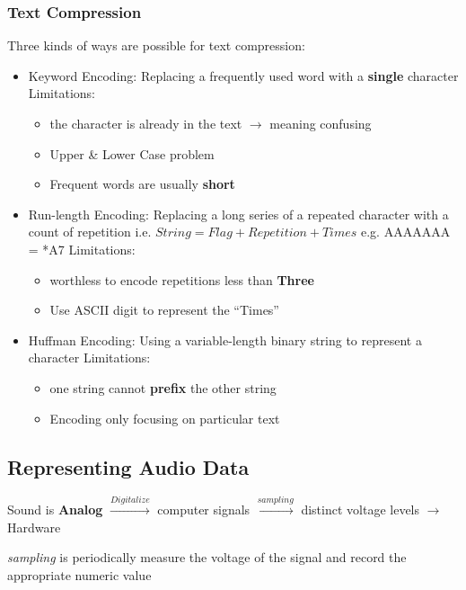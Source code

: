 \documentclass[12pt]{article}
\begin{document}
\subsubsection{Text Compression}
Three kinds of ways are possible for text compression:
\begin{itemize}
    \item Keyword Encoding: Replacing a frequently used word with a \textbf{single} character \newline
    Limitations:
    \begin{itemize}
        \item the character is already in the text $\rightarrow$ meaning confusing
        \item Upper \& Lower Case problem
        \item Frequent words are usually \textbf{short}
    \end{itemize}
    \item Run-length Encoding: Replacing a long series of a repeated character with a count of repetition\newline
    i.e. $String = Flag + Repetition + Times$ \newline
    e.g. AAAAAAA = *A7 \newline
    Limitations:
    \begin{itemize}
        \item worthless to encode repetitions less than \textbf{Three}
        \item Use ASCII digit to represent the ``Times''
    \end{itemize}
    \item Huffman Encoding: Using a variable-length binary string to represent a character
    Limitations:
    \begin{itemize}
        \item one string cannot \textbf{prefix} the other string
        \item Encoding only focusing on particular text
    \end{itemize}
\end{itemize}

\subsection{Representing Audio Data}
Sound is \textbf{Analog} $\xrightarrow{Digitalize}$ computer signals $\xrightarrow{sampling}$ distinct voltage levels $\rightarrow$ Hardware

\emph{sampling} is periodically measure the voltage of the signal and record the appropriate numeric value
\end{document}
